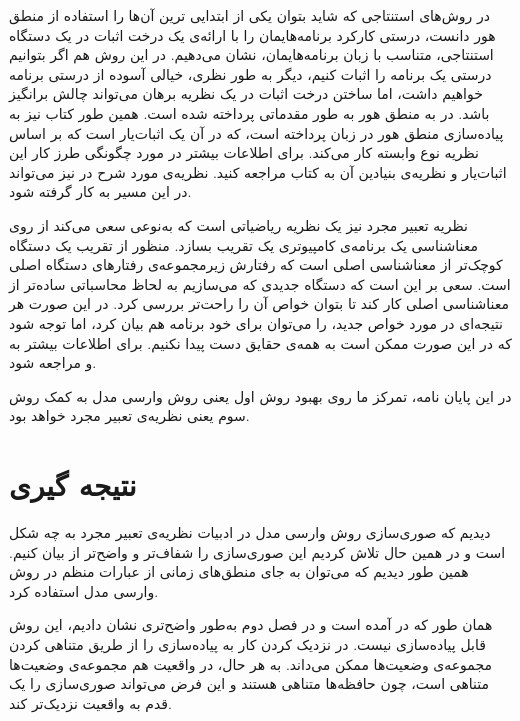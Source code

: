 \documentclass[12pt]{report}
\begin{document}
در روش‌های استنتاجی که شاید بتوان یکی از ابتدایی ترین آن‌ها را استفاده از منطق هور\cite{hoare} دانست، درستی کارکرد برنامه‌هایمان را با ارائه‌ی یک درخت اثبات در یک دستگاه استنتاجی، متناسب با زبان برنامه‌هایمان، نشان می‌‌دهیم. در این روش هم اگر بتوانیم درستی یک برنامه را اثبات کنیم، دیگر به‌ طور نظری، خیالی آسوده از درستی برنامه خواهیم داشت، اما ساختن درخت اثبات در یک نظریه برهان می‌تواند چالش بر‌انگیز باشد. در\cite{logicincs} به منطق هور به طور مقدماتی پرداخته شده است. همین ‌طور کتاب\cite{softwarefoundations} نیز به پیاده‌سازی منطق هور در زبان  پرداخته است، که در آن  یک اثبات‌یار است که بر اساس نظریه نوع وابسته کار می‌کند. برای اطلاعات بیشتر در مورد چگونگی طرز کار این اثبات‌یار و نظریه‌ی بنیادین آن به کتاب\cite{chlipala} مراجعه‌ کنید. نظریه‌ی مورد شرح در\cite{dynamic} نیز می‌تواند در این مسیر به کار گرفته شود.

نظریه تعبیر مجرد\cite{cousot1} نیز یک نظریه ریاضیاتی است که به‌نوعی سعی می‌کند از روی معناشناسی یک برنامه‌ی کامپیوتری\cite{winskel} یک تقریب بسازد. منظور از تقریب یک دستگاه کوچک‌تر از معناشناسی اصلی است که رفتارش زیرمجموعه‌ی رفتارهای دستگاه اصلی است. سعی بر این است که دستگاه جدیدی که می‌سازیم به لحاظ محاسباتی ساده‌تر از معناشناسی اصلی کار کند تا بتوان خواص آن را راحت‌تر بررسی کرد. در این صورت هر نتیجه‌ای در مورد خواص جدید، را می‌توان برای خود برنامه هم بیان کرد، اما توجه شود که در این صورت ممکن است به همه‌ی حقایق دست پیدا نکنیم. برای اطلاعات بیشتر به \cite{cousotbook} و \cite{statica} مراجعه شود.

در این پایان نامه، تمرکز ما روی بهبود روش اول یعنی روش وارسی مدل به کمک روش سوم یعنی نظریه‌ی تعبیر مجرد خواهد بود.


\tableofcontents







\chapter*{نتیجه گیری}
دیدیم که صوری‌سازی روش وارسی مدل در ادبیات نظریه‌ی تعبیر مجرد به چه شکل است و در همین حال تلاش کردیم این صوری‌سازی را شفاف‌تر و واضح‌تر از \cite{calcul} بیان کنیم. همین طور دیدیم که می‌توان به‌ جای منطق‌های زمانی از عبارات منظم در روش وارسی مدل استفاده کرد.

همان طور که در \cite{calcul} آمده است و در فصل دوم به‌طور واضح‌تری نشان دادیم، این روش قابل پیاده‌سازی نیست. در \cite{calcul} نزدیک کردن کار به پیاده‌سازی را از طریق متناهی کردن مجموعه‌ی وضعیت‌ها ممکن می‌‌داند. به ‌هر حال، در واقعیت هم مجموعه‌ی وضعیت‌ها متناهی است، چون حافظه‌ها متناهی هستند و این فرض می‌تواند صوری‌سازی را یک قدم به واقعیت نزدیک‌تر کند.
\end{document}
